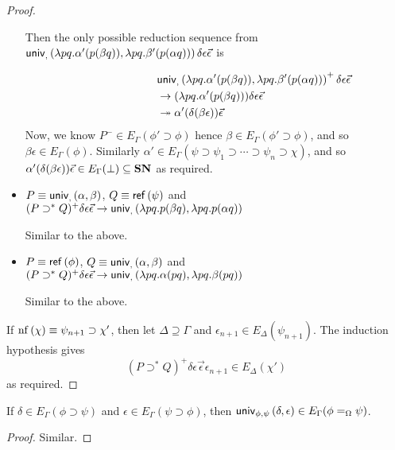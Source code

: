 \begin{proof}
\begin{itemize}
Then the only possible reduction sequence from $\mathsf{univ}_{{} , {}} \left( {\lambda pq.\alpha' (p (\beta q))} , {\lambda pq.\beta' (p (\alpha q))} \right)\delta \epsilon \vec{\epsilon}$ is

\begin{align*}
\lefteqn{\univ{}{}{\lambda pq.\alpha' (p (\beta q))}{\lambda pq.\beta' (p (\alpha q))}^+ \delta \epsilon \vec{\epsilon}} \\
& \rightarrow (\lambda pq.\alpha' (p (\beta q))) \delta \epsilon \vec{\epsilon} \\
& \twoheadrightarrow \alpha' (\delta (\beta \epsilon)) \vec{\epsilon}
\end{align*}
Now, we know $P^- \in E_\Gamma(\phi' \supset \phi)$ hence $\beta \in E_\Gamma(\phi' \supset \phi)$, and so $\beta \epsilon \in E_\Gamma(\phi)$.  Similarly
$\alpha' \in E_\Gamma(\psi \supset \psi_1 \supset \cdots \supset \psi_n \supset \chi)$, and so $\alpha' (\delta (\beta \epsilon)) \vec{\epsilon} \in E_\Gamma(\bot) \subseteq \mathbf{SN}$ as required.
\item
$P \equiv \mathsf{univ}_{{} , {}} \left( {\alpha} , {\beta} \right)$, $Q \equiv \mathsf{ref} \left( {\psi} \right)$ and $(P \supset^* Q)^+ \delta \epsilon \vec{\epsilon} \rightarrow \mathsf{univ}_{{} , {}} \left( {\lambda pq.p(\beta q)} , {\lambda pq.p(\alpha q)} \right)$

Similar to the above.
\item
$P \equiv \mathsf{ref} \left( {\phi} \right)$, $Q \equiv \mathsf{univ}_{{} , {}} \left( {\alpha} , {\beta} \right)$ and $(P \supset^* Q)^+ \delta \epsilon \vec{\epsilon} \rightarrow \mathsf{univ}_{{} , {}} \left( {\lambda pq.\alpha(pq)} , {\lambda pq.\beta(pq)} \right)$

Similar to the above.
\end{itemize}

If $\mathrm{nf} \left( {\chi} \right) \equiv \psi_{n+1} \supset \chi'$, then let $\Delta \supseteq \Gamma$ and $\epsilon_{n+1} \in E_\Delta(\psi_{n+1})$.  The induction hypothesis gives
\[ (P \supset^* Q)^+ \delta \epsilon \vec{\epsilon} \epsilon_{n+1} \in E_\Delta(\chi') \]
as required.
\end{proof}

\begin{lemma}
\label{lm:Euniv}
If $\delta \in E_\Gamma(\phi \supset \psi)$ and $\epsilon \in E_\Gamma(\psi \supset \phi)$, then $\mathsf{univ}_{{\phi} , {\psi}} \left( {\delta} , {\epsilon} \right) \in E_\Gamma(\phi =_\Omega \psi)$.
\end{lemma}

\begin{proof}
Similar.
\end{proof}